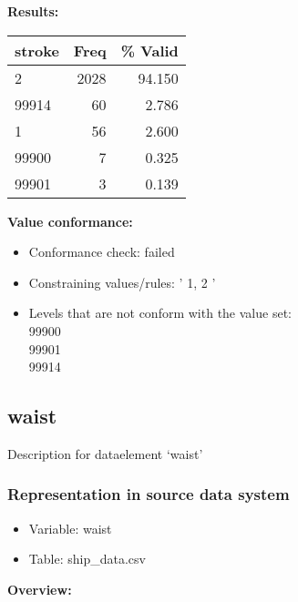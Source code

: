 \documentclass[
]{article}
\providecommand{\tightlist}{%
  \setlength{\itemsep}{0pt}\setlength{\parskip}{0pt}}
\begin{document}
\textbf{Results:}\\

\begin{table}[H]
\centering
\begin{tabular}{l|r|r}
\hline
\textbf{stroke} & \textbf{Freq} & \textbf{\% Valid}\\
\hline
2 & 2028 & 94.150\\
\hline
99914 & 60 & 2.786\\
\hline
1 & 56 & 2.600\\
\hline
99900 & 7 & 0.325\\
\hline
99901 & 3 & 0.139\\
\hline
\end{tabular}
\end{table}

\textbf{Value conformance:}

\begin{itemize}
\tightlist
\item
  Conformance check: failed
\item
  Constraining values/rules: ' 1, 2 '
\item
  Levels that are not conform with the value set:\\
  99900\\
  99901\\
  99914
\end{itemize}

\newpage

\hypertarget{waist}{%
\subsection{waist}\label{waist}}

Description for dataelement `waist'

\hypertarget{representation-in-source-data-system-27}{%
\subsubsection{\texorpdfstring{Representation in \textbf{source} data
system}{Representation in source data system}}\label{representation-in-source-data-system-27}}

\begin{itemize}
\tightlist
\item
  Variable: waist
\item
  Table: ship\_data.csv
\end{itemize}

\textbf{Overview:}
\end{document}
